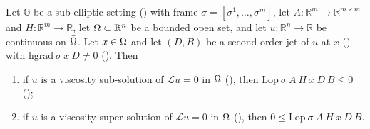 \begin{theorem}[Remark~2.2]
Let $\mathbb G$ be a sub-elliptic setting () with frame
$\sigma=[\sigma^1,\ldots,\sigma^m]$, let
$A:\mathbb R^{m}\to\mathbb R^{m\times m}$ and $H:\mathbb R^{m}\to\mathbb R$, let
$\Omega\subset\mathbb R^{n}$ be a bounded open set, and let $u:\mathbb R^{n}\to\mathbb R$ be
continuous on $\bar{\Omega}$. Let $x\in\Omega$ and let $(D,B)$ be a second-order jet of $u$ at $x$
() with $\mathrm{hgrad}\ \sigma\ x\ D\ne0$ (). Then
\begin{enumerate}
\item if $u$ is a viscosity sub-solution of $\mathcal L u=0$ in $\Omega$
  (), then $\mathrm{Lop}\ \sigma\ A\ H\ x\ D\ B\le0$
  ();
\item if $u$ is a viscosity super-solution of $\mathcal L u=0$ in $\Omega$
  (), then $0\le\mathrm{Lop}\ \sigma\ A\ H\ x\ D\ B$.
\end{enumerate}
\end{theorem}
